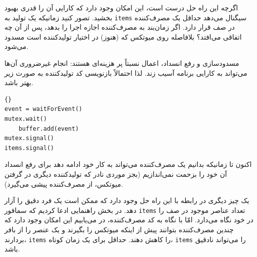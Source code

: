 \documentclass{book}
\begin{document}
    اگرچه این راه حل درست است، این امکان وجود دارد که کارایی آن را قدری بهبود بخشید. 
    تصور کنید زمانیکه یک تولید به {\tt items} سیگنال می‌دهد حداقل یک مصرف‌کننده در صف قرار دارد. 
    اگر زمان‌بند به مصرف‌کننده اجازه اجرا را بدهد، پس از آن چه اتفاقی می‌افتد؟
    بلافاصله روی میوتکس که (هنوز) در اختیار تولیدکننده است مسدود می‌شود. 

    مسدودسازی و رفع انسداد، اعمال نسبتاً پر هزینه‌ای هستند: 
    انجام غیرضروری آن‌ها می‌تواند به کارایی برنامه آسیب زند. لذا احتمالاً بازنویسی کد تولیدکننده به صورت زیر بهتر باشد. 
\begin{latin}
\begin{latin}
\begin{lstlisting}[title=\rl{راه حل بهبود یافتهٔ تولیدکننده}]{}
event = waitForEvent()
mutex.wait()
    buffer.add(event)
mutex.signal()
items.signal()
\end{lstlisting}
\end{latin}
\end{latin}

    اکنون تا زمانیکه بدانیم یک مصرف‌کننده می‌تواند به کار خود ادامه دهد برای رفع انسداد آن خود را بزحمت نمی‌اندازیم 
    (بجز موردی نادر که تولید‌کننده‌ دیگری در گرفتن میوتکس، از مصرف‌کننده پیشی می‌گیرد).
    
    یک چیز دیگری در رابطه با این راه حل وجود دارد که ممکن است یک فرد دقیق را آزار دهد. 
    در بخش راهنمایی ادعا کردیم که سمافور {\tt items} تعداد عناصر موجود در صف را در خود نگاه می‌دارد. امّا با نگاه به کد مصرف‌کننده، 
    در می‌یابیم این امکان وجود دارد که چندین مصرف‌کننده بتوانند پیش از اینکه میوتکس را بگیرند و یک عنصر را از بافر بردارند، {\tt items} را  کاهش دهند. 
    حداقل برای یک زمان کوتاه، {\tt items} را  می‌تواند نادقیق باشد. 
\end{document}
